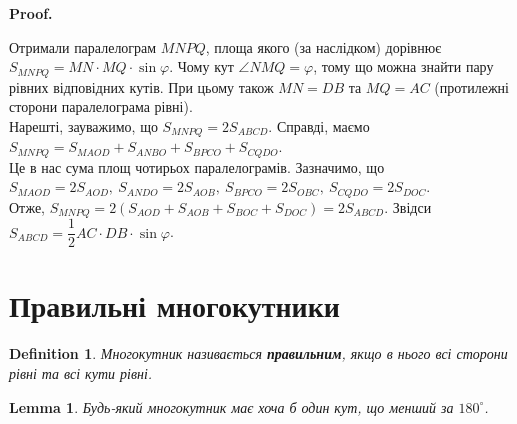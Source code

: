 \documentclass[a4paper, 10pt]{article}
\makeatletter
\theoremstyle{theoremdd}
\theoremstyle{theoremdd}
\theoremstyle{theoremdd}
\newtheorem{definition}[theorem]{Definition}
\theoremstyle{theoremdd}
\theoremstyle{theoremdd}
\theoremstyle{theoremdd}
\theoremstyle{theoremdd}
\theoremstyle{theoremdd}
\newtheorem{lemma}[theorem]{Lemma}
\theoremstyle{theoremdd}
\renewenvironment{proof}[1][Proof.\\]{\par
\pushQED{\hfill \qed}%
\normalfont \topsep6\p@\@plus6\p@\relax
\trivlist
\item\relax
{\bfseries
#1\@addpunct{.}}\hspace\labelsep\ignorespaces
}{%
\popQED\endtrivlist\@endpefalse
}
\makeatother
\begin{document}
\begin{proof}
\begin{figure}[H]
\end{figure}
Отримали паралелограм $MNPQ$, площа якого (за наслідком) дорівнює $S_{MNPQ} = MN \cdot MQ \cdot \sin \varphi$. Чому кут $\angle NMQ = \varphi$, тому що можна знайти пару рівних відповідних кутів. При цьому також $MN = DB$ та $MQ = AC$ (протилежні сторони паралелограма рівні).\\
Нарешті, зауважимо, що $S_{MNPQ} = 2S_{ABCD}$. Справді, маємо\\
$S_{MNPQ} = S_{MAOD} + S_{ANBO} + S_{BPCO} + S_{CQDO}$.\\
Це в нас сума площ чотирьох паралелограмів. Зазначимо, що \\
$S_{MAOD} = 2 S_{AOD},\ S_{ANDO} = 2 S_{AOB},\ S_{BPCO} = 2 S_{OBC},\ S_{CQDO} = 2 S_{DOC}$.\\
Отже, $S_{MNPQ} = 2 (S_{AOD} + S_{AOB} + S_{BOC} + S_{DOC}) = 2 S_{ABCD}$. Звідси $S_{ABCD} = \dfrac{1}{2} AC \cdot DB \cdot \sin \varphi$.
\end{proof}

\newpage
\section{Правильні многокутники}
\begin{definition}
Многокутник називається \textbf{правильним}, якщо в нього всі сторони рівні та всі кути рівні.
\end{definition}

\begin{lemma}
Будь-який многокутник має хоча б один кут, що менший за $180^\circ$.
\end{lemma}
\end{document}
